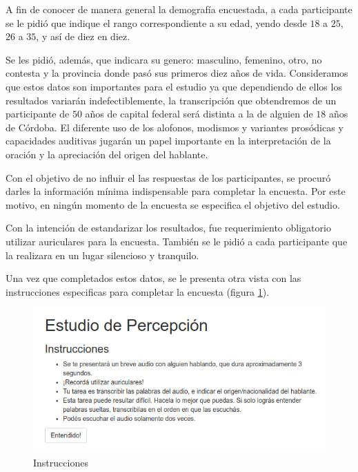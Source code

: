 A fin de conocer de manera general la demografía encuestada, a cada participante se le pidió que indique el rango correspondiente a su edad, yendo desde $18$ a $25$, $26$ a $35$, y así de diez en diez.

Se les pidió, además, que indicara su genero: masculino, femenino, otro, no contesta y la provincia donde pasó sus primeros diez años de vida. Consideramos que estos datos son importantes para el estudio ya que dependiendo de ellos los resultados variarán indefectiblemente, la transcripción que obtendremos de un participante de $50$ años de capital federal será distinta a la de alguien de $18$ años de Córdoba. El diferente uso de los alofonos, modismos y variantes prosódicas y capacidades auditivas jugarán un papel importante en la interpretación de la oración y la apreciación del origen del hablante.

Con el objetivo de no influir el las respuestas de los participantes, se procuró darles la información mínima indispensable para completar la encuesta. Por este motivo, en ningún momento de la encuesta se especifica el objetivo del estudio.

Con la intención de estandarizar los resultados, fue requerimiento obligatorio utilizar auriculares para la encuesta. También se le pidió a cada participante que la realizara en un lugar silencioso y tranquilo.

Una vez que completados estos datos, se le presenta otra vista con las instrucciones especificas para completar la encuesta (figura \ref{instrucciones}).

\begin{figure}
\begin{center}
\includegraphics[scale=0.6]{estudio_online/estudio2.png}
\end{center}
\caption{Instrucciones}
\label{instrucciones}
\end{figure}

